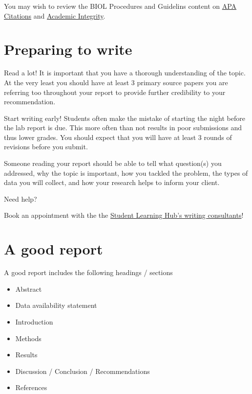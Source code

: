 \documentclass[
]{book}
\providecommand{\tightlist}{%
  \setlength{\itemsep}{0pt}\setlength{\parskip}{0pt}}
\begin{document}
You may wish to review the BIOL Procedures and Guidelins content on \href{https://ubco-biology.github.io/Procedures-and-Guidelines/apa-citations.html}{APA Citations} and \href{https://ubco-biology.github.io/Procedures-and-Guidelines/academic-integrity.html}{Academic Integrity}.

\hypertarget{preparing-to-write}{%
\section*{Preparing to write}\label{preparing-to-write}}

Read a lot! It is important that you have a thorough understanding of the topic. At the very least you should have at least 3 primary source papers you are referring too throughout your report to provide further credibility to your recommendation.

Start writing early! Students often make the mistake of starting the night before the lab report is due. This more often than not results in poor submissions and thus lower grades. You should expect that you will have at least 3 rounds of revisions before you submit.

Someone reading your report should be able to tell what question(s) you addressed, why the topic is important, how you tackled the problem, the types of data you will collect, and how your research helps to inform your client.

Need help?

Book an appointment with the the \href{https://students.ok.ubc.ca/academic-success/learning-hub/writing-language/}{Student Learning Hub's writing consultants}!

\hypertarget{a-good-report}{%
\section*{A good report}\label{a-good-report}}

A good report includes the following headings / sections

\begin{itemize}
\tightlist
\item
  Abstract
\item
  Data availability statement
\item
  Introduction
\item
  Methods
\item
  Results
\item
  Discussion / Conclusion / Recommendations
\item
  References
\end{itemize}
\end{document}

